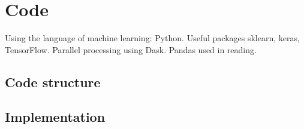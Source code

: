 \section{Code} \label{sec:code}
Using the language of machine learning: Python. Useful packages sklearn, keras, TensorFlow. Parallel processing using Dask. Pandas used in reading. 

\subsection{Code structure} \label{sec:structure}

\subsection{Implementation}

